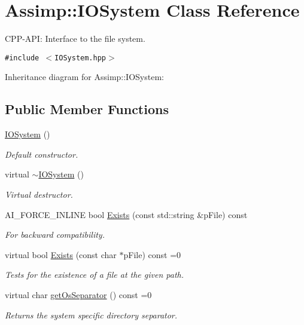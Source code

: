 \hypertarget{class_assimp_1_1_i_o_system}{
\section{Assimp::IOSystem Class Reference}
\label{class_assimp_1_1_i_o_system}
}
CPP-API: Interface to the file system.  


{\tt \#include $<$IOSystem.hpp$>$}

Inheritance diagram for Assimp::IOSystem:\subsection*{Public Member Functions}
\begin{CompactItemize}
\item 
\hyperlink{class_assimp_1_1_i_o_system_f8ba1ee2dc0686da8fc9e3dad49af801}{IOSystem} ()
\begin{CompactList}\small\item\em Default constructor. \item\end{CompactList}\item 
virtual \hyperlink{class_assimp_1_1_i_o_system_617417f1c5125770606fea3b41068b36}{$\sim$IOSystem} ()
\begin{CompactList}\small\item\em Virtual destructor. \item\end{CompactList}\item 
AI\_\-FORCE\_\-INLINE bool \hyperlink{class_assimp_1_1_i_o_system_7ae6cfaea4957408967463bfc3b84b27}{Exists} (const std::string \&pFile) const 
\begin{CompactList}\small\item\em For backward compatibility. \item\end{CompactList}\item 
virtual bool \hyperlink{class_assimp_1_1_i_o_system_79f5fe8d2dbe1056c9418f7de9a72445}{Exists} (const char $\ast$pFile) const =0
\begin{CompactList}\small\item\em Tests for the existence of a file at the given path. \item\end{CompactList}\item 
virtual char \hyperlink{class_assimp_1_1_i_o_system_40e412875b985bdb638f00ef0f20fff6}{getOsSeparator} () const =0
\begin{CompactList}\small\item\em Returns the system specific directory separator. \item\end{CompactList}\item 

\end{CompactItemize}
